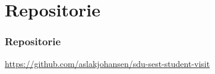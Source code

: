 \section{Repositorie}
\begin{frame}
    \frametitle{Repositorie}
    \begin{center}
      \url{https://github.com/aslakjohansen/sdu-sest-student-visit}
    \end{center}
\end{frame}




